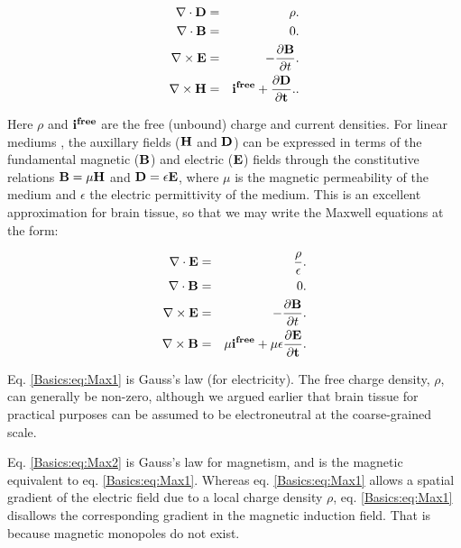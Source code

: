 \begin{eqnarray}
\nabla\cdot {\bf D} & = & \rho. \label{Basics:eq:Max11} \\
\nabla \cdot {\bf B} & = & 0.  \label{Basics:eq:Max22} \\
\nabla \times {\bf E} & = & - \frac{\partial {\bf B}}{\partial t}.  \label{Basics:eq:Max33} \\
\nabla \times {\bf H} & = & \bf{i^{free}} + \frac{\partial {\bf D}}{\partial t}.  \label{Basics:eq:Max44}.
\end{eqnarray}

Here $\rho$ and $\bf{i^{free}}$ are the free (unbound) charge and current densities. For linear mediums , the auxillary fields (${\bf H}$ and ${\bf D}$) can be expressed in terms of the fundamental magnetic (${\bf B}$) and electric (${\bf E}$) fields through the constitutive relations ${\bf B} = \mu{\bf H}$ and ${\bf D} = \epsilon {\bf E}$, where $\mu$ is the magnetic permeability of the medium and $\epsilon$ the electric permittivity of the medium. This is an excellent approximation for brain tissue, so that we may write the Maxwell equations at the form:

\begin{eqnarray}
\nabla\cdot {\bf E} & = & \frac{\rho}{\epsilon}. \label{Basics:eq:Max1} \\
\nabla \cdot {\bf B} & = & 0.  \label{Basics:eq:Max2} \\
\nabla \times {\bf E} & = & - \frac{\partial {\bf B}}{\partial t}.  \label{Basics:eq:Max3} \\
\nabla \times {\bf B} & = & \mu\bf{i^{free}} + \mu\epsilon\frac{\partial {\bf E}}{\partial t}.  \label{Basics:eq:Max4}
\end{eqnarray}


Eq. \ref{Basics:eq:Max1} is Gauss's law (for electricity). The free charge density, $\rho$, can generally be non-zero, although we argued earlier that brain tissue for practical purposes can be assumed to be electroneutral at the coarse-grained scale. 

Eq. \ref{Basics:eq:Max2} is Gauss's law for magnetism, and is the magnetic equivalent to eq. \ref{Basics:eq:Max1}. Whereas eq. \ref{Basics:eq:Max1} allows a spatial gradient of the electric field due to a local charge density $\rho$, eq. \ref{Basics:eq:Max1} disallows the corresponding gradient in the magnetic induction field. That is because magnetic monopoles do not exist. 


